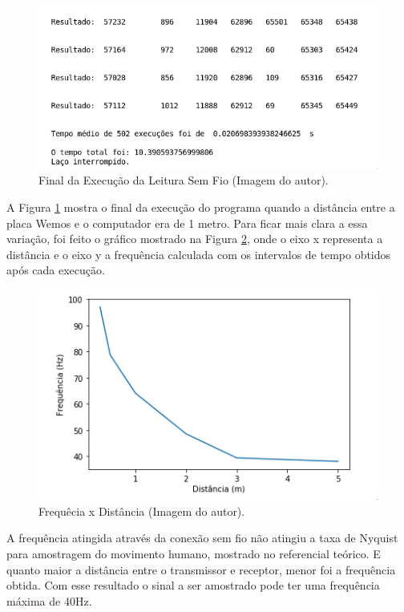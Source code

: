 		\begin{figure}[h!]
		\centering
		\includegraphics[keepaspectratio=true,scale=0.6]{figuras/execute_html.png}
		\caption{Final da Execução da Leitura  Sem Fio (Imagem do autor).}
		
		\label{exechtml}	
	\end{figure}
	
	
	A Figura \ref{exechtml} mostra o final da execução do programa quando a distância entre a placa Wemos e o computador era de 1 metro.  Para ficar mais clara a essa variação, foi feito o gráfico mostrado na Figura \ref{grafico}, onde o eixo x representa a distância e o eixo y a frequência calculada com os intervalos de  tempo obtidos após cada execução.
	
	\begin{figure}[h!]
		\centering
		\includegraphics[keepaspectratio=true,scale=0.8]{figuras/frequenciaXdist.png}
		\caption{Frequêcia x Distância (Imagem do autor).}
		\label{grafico}	
	\end{figure}
	
	A frequência atingida através da conexão sem fio não atingiu a taxa de Nyquist para amostragem do movimento humano, mostrado no referencial teórico. E quanto maior a distância entre o transmissor e receptor, menor foi a frequência obtida. Com esse resultado o sinal a ser amostrado pode ter uma frequência máxima de 40Hz.
	
